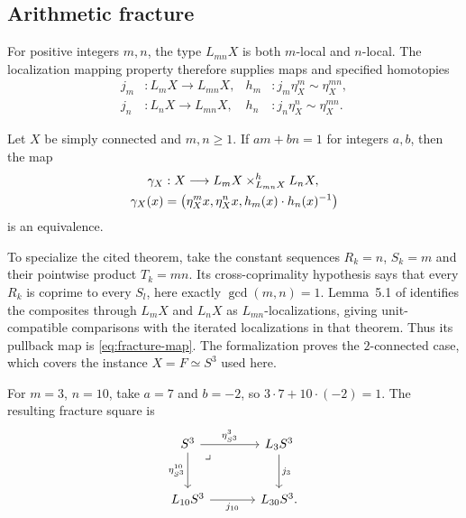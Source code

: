 \subsection{Arithmetic fracture}\label{sec:fracture}
For positive integers $m,n$, the type $L_{mn}X$ is both $m$-local and $n$-local. The localization mapping property therefore supplies maps and specified homotopies
\[
\begin{aligned}
j_m &: L_mX\longrightarrow L_{mn}X,
& h_m &: j_m\eta^m_X\sim\eta^{mn}_X,\\
j_n &: L_nX\longrightarrow L_{mn}X,
& h_n &: j_n\eta^n_X\sim\eta^{mn}_X.
\end{aligned}
\]
\begin{theorem}\label{thm:fracture}
Let $X$ be simply connected and $m,n\geq1$. If $am+bn=1$ for integers $a,b$, then the map
\begin{equation}\label{eq:fracture-map}
\begin{aligned}
\gamma_X &: X\longrightarrow L_mX\mathbin{\times}^{h}_{L_{mn}X}L_nX,\\
\gamma_X(x)&=\bigl(\eta^m_Xx,\eta^n_Xx,h_m(x)\cdot h_n(x)^{-1}\bigr)
\end{aligned}
\end{equation}
is an equivalence.
\end{theorem}
To specialize the cited theorem, take the constant sequences $R_k=n$, $S_k=m$ and their pointwise product $T_k=mn$. Its cross-coprimality hypothesis says that every $R_k$ is coprime to every $S_l$, here exactly $\gcd(m,n)=1$. Lemma~5.1 of \cite{scoccola} identifies the composites through $L_mX$ and $L_nX$ as $L_{mn}$-localizations, giving unit-compatible comparisons with the iterated localizations in that theorem. Thus its pullback map is \eqref{eq:fracture-map}. The formalization proves the $2$-connected case, which covers the instance $X=F\simeq S^3$ used here.

For $m=3$, $n=10$, take $a=7$ and $b=-2$, so $3\cdot7+10\cdot(-2)=1$. The resulting fracture square is
\begin{equation}\label{eq:sphere-fracture}
\begin{tikzcd}[column sep=large,row sep=large]
S^3 \arrow[r,"\eta^3_{S^3}"] \arrow[d,"\eta^{10}_{S^3}"'] \pbmark & L_3S^3 \arrow[d,"j_3"] \\
L_{10}S^3 \arrow[r,"j_{10}"'] & L_{30}S^3.
\end{tikzcd}
\end{equation}

